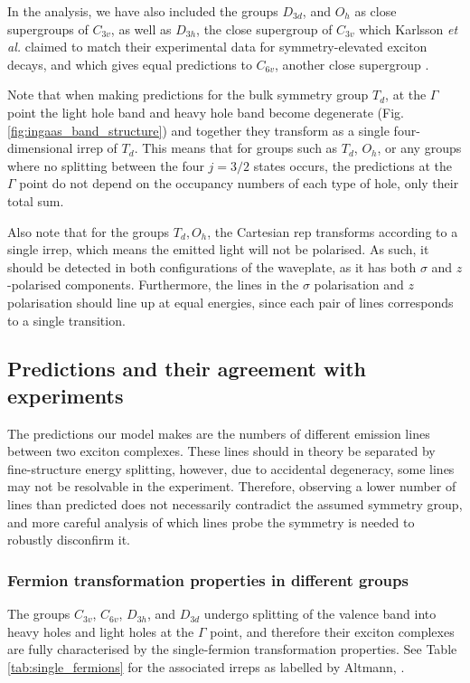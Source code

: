 In the analysis, we have also included the groups $D_{3d}$, and $O_h$ as close supergroups of $C_{3v}$, as well as $D_{3h}$, the close supergroup of $C_{3v}$ which Karlsson \textit{et al.} claimed to match their experimental data for symmetry-elevated exciton decays, and which gives equal predictions to $C_{6v}$, another close supergroup \cite[p. 19]{karlsson} .

Note that when making predictions for the bulk symmetry group $T_d$, at the $\Gamma$ point the light hole band and heavy hole band become degenerate (Fig. \ref{fig:ingaas_band_structure}) and together they transform as a single four-dimensional irrep of $T_d$. This means that for groups such as $T_d$, $O_h$, or any groups where no splitting between the four $j=3/2$ states occurs, the predictions at the $\Gamma$ point do not depend on the occupancy numbers of each type of hole, only their total sum.

Also note that for the groups $T_d, O_h$, the Cartesian rep transforms according to a single irrep, which means the emitted light will not be polarised. As such, it should be detected in both configurations of the waveplate, as it has both $\sigma$ and $z$-polarised components. Furthermore, the lines in the $\sigma$ polarisation and $z$ polarisation should line up at equal energies, since each pair of lines corresponds to a single transition.

\subsection{Predictions and their agreement with experiments}
The predictions our model makes are the numbers of different emission lines between two exciton complexes. These lines should in theory be separated by fine-structure energy splitting, however, due to accidental degeneracy, some lines may not be resolvable in the experiment. Therefore, observing a lower number of lines than predicted does not necessarily contradict the assumed symmetry group, and more careful analysis of which lines probe the symmetry is needed to robustly disconfirm it.

\subsubsection{Fermion transformation properties in different groups}
The groups $C_{3v}$, $C_{6v}$, $D_{3h}$, and $D_{3d}$ undergo splitting of the valence band into heavy holes and light holes at the $\Gamma$ point, and therefore their exciton complexes are fully characterised by the single-fermion transformation properties. See Table \ref{tab:single_fermions} for the associated irreps as labelled by Altmann, \cite{altmann}.

